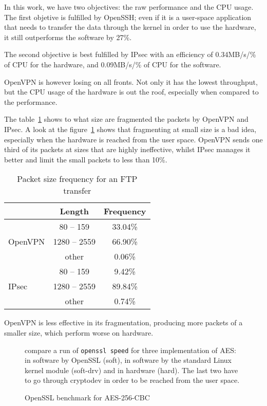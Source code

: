 In this work, we have two objectives: the raw performance and the CPU usage.
The first objetive is fulfilled by OpenSSH; even if it is a user-space application that needs to transfer the data through the kernel in order to use the hardware, it still outperforms the software by 27\%.

\noindent The second objective is best fulfilled by IPsec with an efficiency of 0.34MB/s/\% of CPU for the hardware, and 0.09MB/s/\% of CPU for the software.

OpenVPN is however losing on all fronts. Not only it has the lowest throughput, but the CPU usage of the hardware is out the roof, especially when compared to the performance.

\noindent The table~\ref{tab:ftp-fragmentation} shows to what size are fragmented the packets by OpenVPN and IPsec.
A look at the figure~\ref{fig:openssl-speed} shows that fragmenting at small size is a bad idea, especially when the hardware is reached from the user space.
OpenVPN sends one third of its packets at sizes that are highly ineffective, whilst IPsec manages it better and limit the small packets to less than 10\%.

\begin{table}
\center
\begin{tabular}{l|c|c|} \cline{2-3}
 & Length & Frequency \\ \hline
\multicolumn{1}{|l|}{\multirow{3}{*}{OpenVPN}} & 80 -- 159 & 33.04\% \\ \cline{2-3}
\multicolumn{1}{|l|}{} & 1280 -- 2559 & 66.90\% \\ \cline{2-3}
\multicolumn{1}{|l|}{} & other & 0.06\% \\ \hline
\multicolumn{1}{|l|}{\multirow{3}{*}{IPsec}} & 80 -- 159 & 9.42\% \\ \cline{2-3}
\multicolumn{1}{|l|}{} & 1280 -- 2559 & 89.84\% \\ \cline{2-3}
\multicolumn{1}{|l|}{} & other & 0.74\% \\ \hline
\end{tabular}
\caption{Packet size frequency for an FTP transfer}{OpenVPN is less effective in its fragmentation, producing more packets of a smaller size, which perform worse on hardware.}
\label{tab:ftp-fragmentation}
\end{table}


\begin{figure}[ht]

\caption{OpenSSL benchmark for AES-256-CBC}{compare a run of \texttt{openssl speed} for three implementation of AES: in software by OpenSSL (soft), in software by the standard Linux kernel module (soft-drv) and in hardware (hard). The last two have to go through cryptodev in order to be reached from the user space.}
\label{fig:openssl-speed}
\end{figure}

